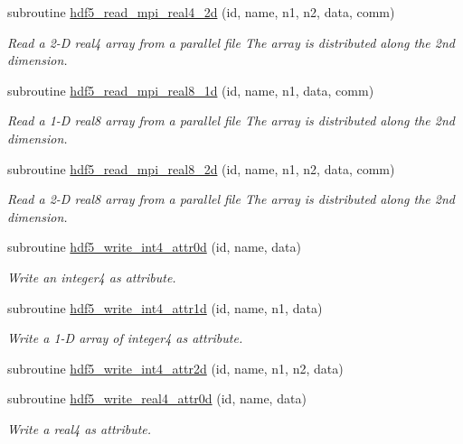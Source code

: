 \begin{DoxyCompactItemize}
subroutine \hyperlink{classmodhdf5_a406b07a6320d4dd08a12ca4b8d6b9e9d}{hdf5\-\_\-read\-\_\-mpi\-\_\-real4\-\_\-2d} (id, name, n1, n2, data, comm)
\begin{DoxyCompactList}\small\item\em Read a 2-\/\-D real4 array from a parallel file The array is distributed along the 2nd dimension. \end{DoxyCompactList}\item 
subroutine \hyperlink{classmodhdf5_afaf6a2a85551a1a7e9638d597c39dc32}{hdf5\-\_\-read\-\_\-mpi\-\_\-real8\-\_\-1d} (id, name, n1, data, comm)
\begin{DoxyCompactList}\small\item\em Read a 1-\/\-D real8 array from a parallel file The array is distributed along the 2nd dimension. \end{DoxyCompactList}\item 
subroutine \hyperlink{classmodhdf5_a29c6c1a0c3de14678ed8eebe304b3255}{hdf5\-\_\-read\-\_\-mpi\-\_\-real8\-\_\-2d} (id, name, n1, n2, data, comm)
\begin{DoxyCompactList}\small\item\em Read a 2-\/\-D real8 array from a parallel file The array is distributed along the 2nd dimension. \end{DoxyCompactList}\item 
subroutine \hyperlink{classmodhdf5_a1f5aac5704c10accbb39476926a4a7aa}{hdf5\-\_\-write\-\_\-int4\-\_\-attr0d} (id, name, data)
\begin{DoxyCompactList}\small\item\em Write an integer4 as attribute. \end{DoxyCompactList}\item 
subroutine \hyperlink{classmodhdf5_a41e511ab23277132cad7aa447804eee4}{hdf5\-\_\-write\-\_\-int4\-\_\-attr1d} (id, name, n1, data)
\begin{DoxyCompactList}\small\item\em Write a 1-\/\-D array of integer4 as attribute. \end{DoxyCompactList}\item 
subroutine \hyperlink{classmodhdf5_a902380b589c35be03e33f0ae8ebdc0dc}{hdf5\-\_\-write\-\_\-int4\-\_\-attr2d} (id, name, n1, n2, data)
\item 
subroutine \hyperlink{classmodhdf5_abadf683caad48e7acd96f916246bf778}{hdf5\-\_\-write\-\_\-real4\-\_\-attr0d} (id, name, data)
\begin{DoxyCompactList}\small\item\em Write a real4 as attribute. \end{DoxyCompactList}\item 

\end{DoxyCompactItemize}
